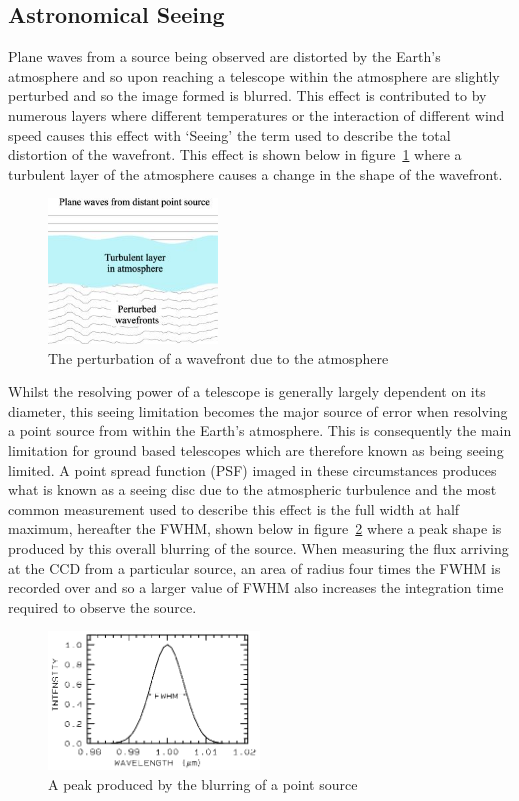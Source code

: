 	\subsection{Astronomical Seeing} %
	\label{sub:astronomical_seeing}
		Plane waves from a source being observed are distorted by the Earth’s atmosphere and so upon reaching a telescope within the atmosphere are slightly perturbed and so the image formed is blurred. This effect is contributed to by numerous layers where different temperatures or the interaction of different wind speed causes this effect with ‘Seeing’ the term used to describe the total distortion of the wavefront\cite[page~188]{Diffraction_Limited_Imaging_Saha}. This effect is shown below in figure~\ref{fig:Seeing} where a turbulent layer of the atmosphere causes a change in the shape of the wavefront.
		\begin{figure}[ht]
			\centering
			\includegraphics[width=0.4\textwidth]{../Images/Seeing.png}
			\caption{The perturbation of a wavefront due to the atmosphere}\label{fig:Seeing}
		\end{figure}

		Whilst the resolving power of a telescope is generally largely dependent on its diameter, this seeing limitation becomes the major source of error when resolving a point source from within the Earth’s atmosphere. This is consequently the main limitation for ground based telescopes which are therefore known as being seeing limited. A point spread function (PSF) imaged in these circumstances produces what is known as a seeing disc due to the atmospheric turbulence and the most common measurement used to describe this effect is the full width at half maximum, hereafter the FWHM, shown below in figure~\ref{fig:FWHM} where a peak shape is produced by this overall blurring of the source. When measuring the flux arriving at the CCD from a particular source, an area of radius four times the FWHM is recorded over and so a larger value of FWHM also increases the integration time required to observe the source.
		\begin{figure}[ht]
			\centering
			\includegraphics[width=0.5\textwidth]{../Images/FWHM.png}
			\caption{A peak produced by the blurring of a point source}\label{fig:FWHM}
		\end{figure}

